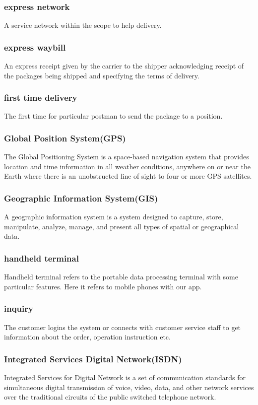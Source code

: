 \documentclass[12pt]{scrreprt}
\begin{document}
\begin{spacing}{0.7}
\subsubsection{express network}
A service network within the scope to help delivery.
\subsubsection{express waybill}
An express receipt given by the carrier to the shipper acknowledging receipt
of the packages being shipped and specifying the terms of delivery.
\subsubsection{first time delivery}
The first time for particular postman to send the package to a position.
\subsubsection{Global Position System(GPS)}
The Global Positioning System is a space-based navigation system that
provides location and time information in all weather conditions,
anywhere on or near the Earth where there is an unobstructed line of
sight to four or more GPS satellites.
\subsubsection{Geographic Information System(GIS)}
A geographic information system is a system designed to capture,
store, manipulate, analyze, manage, and present all types of spatial
or geographical data.
\subsubsection{handheld terminal}
Handheld terminal refers to the portable data processing terminal
with some particular features. Here it refers to mobile phones with our app.
\subsubsection{inquiry}
The customer logins the system or connects with customer service staff to get
information about the order, operation instruction etc.
\subsubsection{Integrated Services Digital Network(ISDN)}
Integrated Services for Digital Network is a set of communication standards
for simultaneous digital transmission of voice, video, data, and other
network services over the traditional circuits of the public switched
telephone network.

\end{spacing}
\end{document}
